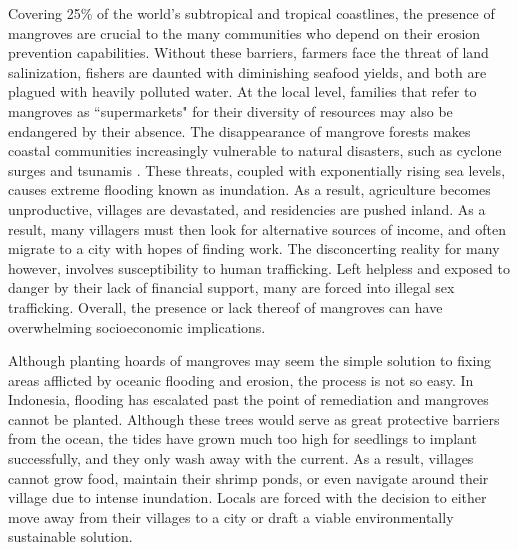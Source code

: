 Covering 25\% of the world's subtropical and tropical coastlines, the presence of mangroves are crucial to the many communities who depend on their erosion prevention capabilities. Without these barriers, farmers face the threat of land salinization, fishers are daunted with diminishing seafood yields, and both are plagued with heavily polluted water.  At the local level, families that refer to mangroves as ``supermarkets" for their diversity of resources may also be endangered by their absence. The disappearance of mangrove forests makes coastal communities increasingly vulnerable to natural disasters, such as cyclone surges and tsunamis \citep{aluri2013reproductive}. These threats, coupled with exponentially rising sea levels, causes  extreme flooding known as inundation. As a result, agriculture becomes unproductive, villages are devastated, and residencies are pushed inland. As a result, many villagers must then look for alternative sources of income, and often migrate to a city with hopes of finding work. The disconcerting reality for many however, involves susceptibility to human trafficking. Left helpless and exposed to danger by their lack of financial support, many are forced into illegal sex trafficking. Overall, the presence or lack thereof of mangroves can have overwhelming socioeconomic implications.

Although planting hoards of mangroves may seem the simple solution to fixing areas afflicted by oceanic flooding and erosion, the process is not so easy. In Indonesia, flooding has escalated past the point of remediation and mangroves cannot be planted. Although these trees would serve as great protective barriers from the ocean, the tides have grown much too high for seedlings to implant successfully, and they only wash away with the current. As a result, villages cannot grow food, maintain their shrimp ponds, or even navigate around their village due to intense inundation. Locals are forced with the decision to either move away from their villages to a city or draft a viable environmentally sustainable solution.
  
  
